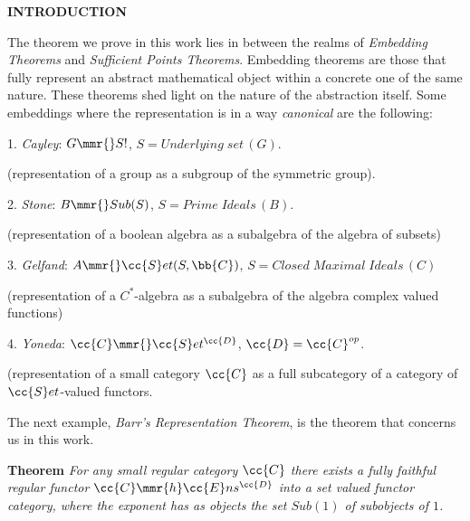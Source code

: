 
{\bf INTRODUCTION}

The theorem we prove in this work lies in between the realms of \textit{Embedding Theorems} and \textit{Sufficient Points Theorems}. Embedding theorems are those that fully represent an  abstract mathematical object within a concrete one of the same nature. These theorems shed light on the nature of the abstraction itself. Some embeddings where the representation is in a way \emph{canonical} are the following:

\vspace{1ex}


1. \emph{Cayley}: $G \mmr{} S!$, $S = Underlying\;set\,(G)$. 

(representation of a group as a subgroup of the symmetric group).

\vspace{1ex}

2. \emph{Stone}: 
$B \mmr{} Sub(S)$, $S = Prime \; Ideals\,(B)$.

(representation of a boolean algebra as a subalgebra of the algebra of subsets)

\vspace{1ex}

3. \emph{Gelfand}: 
$A \mmr{} \cc{S}et(S, \bb{C})$, 
$S = Closed\;Maximal\;Ideals\,(C)$

(representation of a $C^*$-algebra as a subalgebra of the algebra complex valued functions)

\vspace{1ex}

4. \emph{Yoneda}: 
$\cc{C} \mmr{} \cc{S}et^{\cc{D}}$, $\cc{D} = \cc{C}^{op}$.

(representation of a small category $\cc{C}$ as a full subcategory of a category of $\cc{S}et$-valued functors.

\vspace{1ex}

The next example,  \emph{Barr's Representation Theorem}, is the theorem that concerns us in this work.

{\bf Theorem}
\emph{For any small regular category $\cc{C}$ there exists a fully faithful regular functor ${\cc{C} \mmr{h} \cc{E}ns^{\cc{D}}}$ into a set valued functor category, where the exponent has as objects the set $Sub(1)$ of subobjects of $1$.} 


